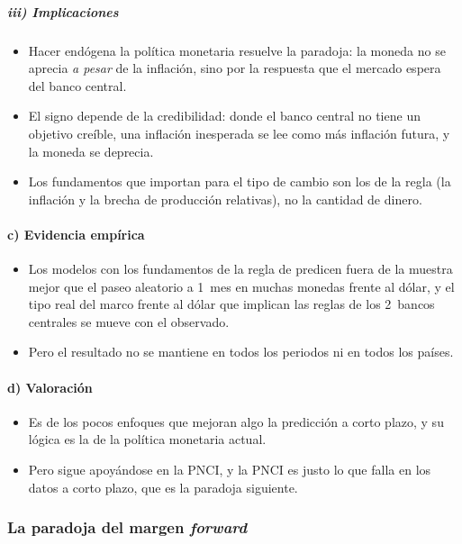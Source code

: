 \documentclass[11pt]{article}
\begin{document}
\subparagraph{iii) Implicaciones}
\begin{itemize}
\item Hacer endógena la política monetaria resuelve la paradoja: la moneda no se aprecia \emph{a pesar} de la inflación, sino por la respuesta que el mercado espera del banco central.
\item El signo depende de la credibilidad: donde el banco central no tiene un objetivo creíble, una inflación inesperada se lee como más inflación futura, y la moneda se deprecia.
\item Los fundamentos que importan para el tipo de cambio son los de la regla (la inflación y la brecha de producción relativas), no la cantidad de dinero.
\end{itemize}

\paragraph{c) Evidencia empírica}
\begin{itemize}
\item Los modelos con los fundamentos de la regla de  predicen fuera de la muestra mejor que el paseo aleatorio a 1~mes en muchas monedas frente al dólar\nocite{MolodtsovaPapell2009}, y el tipo real del marco frente al dólar que implican las reglas de los 2~bancos centrales se mueve con el observado\nocite{EngelWest2006Taylor}.
\item Pero el resultado no se mantiene en todos los periodos ni en todos los países\nocite{Rossi2013}.
\end{itemize}

\paragraph{d) Valoración}
\begin{itemize}
\item Es de los pocos enfoques que mejoran algo la predicción a corto plazo, y su lógica es la de la política monetaria actual.
\item Pero sigue apoyándose en la PNCI, y la PNCI es justo lo que falla en los datos a corto plazo, que es la paradoja siguiente.
\end{itemize}

\subsubsection{La paradoja del margen \emph{forward}}\label{sec:paradoja-forward}
\end{document}
